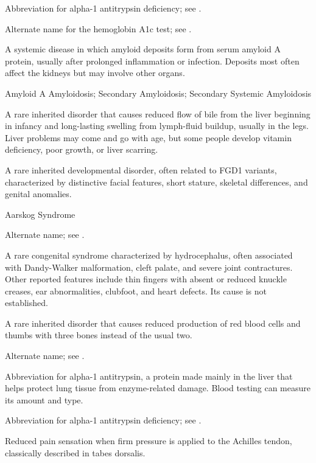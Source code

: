  Abbreviation for alpha-1 antitrypsin deficiency; see .

 Alternate name for the hemoglobin A1c test; see .

 A systemic disease in which amyloid deposits form from serum amyloid A protein, usually after prolonged inflammation or infection. Deposits most often affect the kidneys but may involve other organs.

\synonyms
Amyloid A Amyloidosis; Secondary Amyloidosis; Secondary Systemic Amyloidosis

 A rare inherited disorder that causes reduced flow of bile from the liver beginning in infancy and long-lasting swelling from lymph-fluid buildup, usually in the legs. Liver problems may come and go with age, but some people develop vitamin deficiency, poor growth, or liver scarring.

 A rare inherited developmental disorder, often related to FGD1 variants, characterized by distinctive facial features, short stature, skeletal differences, and genital anomalies.

\synonyms
Aarskog Syndrome

 Alternate name; see .

 A rare congenital syndrome characterized by hydrocephalus, often associated with Dandy-Walker malformation, cleft palate, and severe joint contractures. Other reported features include thin fingers with absent or reduced knuckle creases, ear abnormalities, clubfoot, and heart defects. Its cause is not established.

 A rare inherited disorder that causes reduced production of red blood cells and thumbs with three bones instead of the usual two.

 Alternate name; see .

 Abbreviation for alpha-1 antitrypsin, a protein made mainly in the liver that helps protect lung tissue from enzyme-related damage. Blood testing can measure its amount and type.

 Abbreviation for alpha-1 antitrypsin deficiency; see .

 Reduced pain sensation when firm pressure is applied to the Achilles tendon, classically described in tabes dorsalis.

